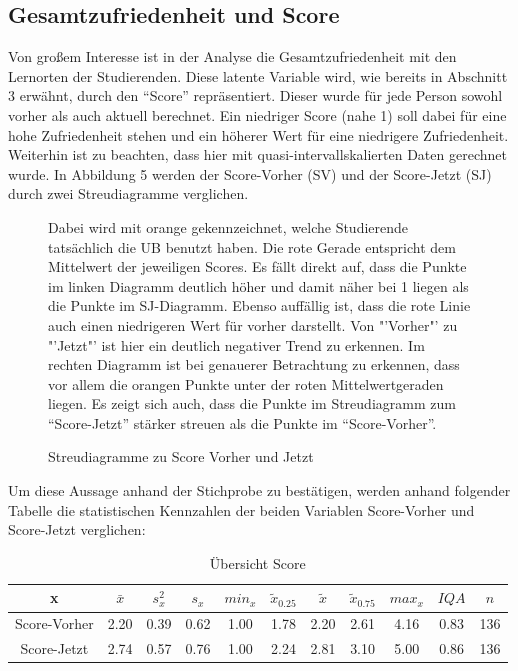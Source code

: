 \documentclass[11pt, a4paper]{article}
\begin{document}
\subsection{Gesamtzufriedenheit und Score}



Von großem Interesse ist in der Analyse die Gesamtzufriedenheit mit den Lernorten der Studierenden.
Diese latente Variable wird, wie bereits in Abschnitt 3 erwähnt, durch den “Score” repräsentiert. Dieser wurde für jede Person sowohl vorher als auch aktuell berechnet.
Ein niedriger Score (nahe 1) soll dabei für eine hohe Zufriedenheit stehen und ein höherer Wert für eine niedrigere Zufriedenheit.\\
Weiterhin ist zu beachten, dass hier mit quasi-intervallskalierten Daten gerechnet wurde.
In Abbildung 5 werden der Score-Vorher (SV) und der Score-Jetzt (SJ) durch zwei Streudiagramme verglichen.

\vspace{-0.5cm}
\begin{figure}[h]

\vspace{-1.8cm}
\caption{Streudiagramme zu Score Vorher und Jetzt}
\vspace{1cm}
Dabei wird mit orange gekennzeichnet, welche Studierende tatsächlich die UB benutzt haben. Die rote Gerade entspricht dem Mittelwert der jeweiligen Scores.
Es fällt direkt auf, dass die Punkte im linken Diagramm deutlich höher und damit näher bei 1 liegen als die Punkte im SJ-Diagramm.
Ebenso auffällig ist, dass die rote Linie auch einen niedrigeren Wert für vorher darstellt.
Von "'Vorher"' zu "'Jetzt"' ist hier ein deutlich negativer Trend zu erkennen.
Im rechten Diagramm ist bei genauerer Betrachtung zu erkennen, dass vor allem die orangen Punkte unter der roten Mittelwertgeraden liegen.
Es zeigt sich auch, dass die Punkte im Streudiagramm zum “Score-Jetzt” stärker streuen als die Punkte im “Score-Vorher”.


\end{figure}
\newpage
Um diese Aussage anhand der Stichprobe zu bestätigen, werden anhand folgender Tabelle die statistischen Kennzahlen der beiden Variablen Score-Vorher und Score-Jetzt verglichen: 



\begin{table}[h]
	\begin{center}
	\vspace{0.2cm}
	\begin{tabular}{c|ccccccccc|c}
		x & $\bar{x}$ & $s_x^2$ & $s_x$ & $min_x$ & $\tilde{x}_{0.25}$ & $\tilde{x}$ & $\tilde{x}_{0.75}$ & $max_x$ & $IQA$ & $n$ \\ \hline
		Score-Vorher & 2.20 & 0.39 & 0.62 & 1.00 & 1.78 & 2.20 & 2.61 & 4.16 & 0.83 & 136 \\
		Score-Jetzt & 2.74 & 0.57 & 0.76 & 1.00 & 2.24 & 2.81 & 3.10 & 5.00 & 0.86 & 136
	\end{tabular}
	\vspace{0.2cm}
	\caption{Übersicht Score}
\end{center}
\end{table}
\end{document}
